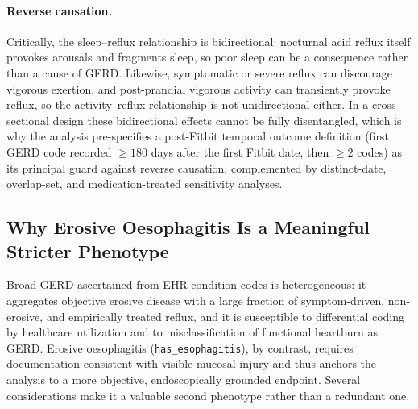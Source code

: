 \documentclass[11pt]{article}
\newcommand{\code}[1]{\texttt{\small #1}}
\begin{document}
\paragraph{Reverse causation.} Critically, the sleep--reflux relationship is bidirectional: nocturnal acid reflux itself provokes arousals and fragments sleep, so poor sleep can be a consequence rather than a cause of GERD. Likewise, symptomatic or severe reflux can discourage vigorous exertion, and post-prandial vigorous activity can transiently provoke reflux, so the activity--reflux relationship is not unidirectional either. In a cross-sectional design these bidirectional effects cannot be fully disentangled, which is why the analysis pre-specifies a post-Fitbit temporal outcome definition (first GERD code recorded $\geq 180$ days after the first Fitbit date, then $\geq 2$ codes) as its principal guard against reverse causation, complemented by distinct-date, overlap-set, and medication-treated sensitivity analyses.

\subsection{Why Erosive Oesophagitis Is a Meaningful Stricter Phenotype}

Broad GERD ascertained from EHR condition codes is heterogeneous: it aggregates objective erosive disease with a large fraction of symptom-driven, non-erosive, and empirically treated reflux, and it is susceptible to differential coding by healthcare utilization and to misclassification of functional heartburn as GERD. Erosive oesophagitis (\code{has_esophagitis}), by contrast, requires documentation consistent with visible mucosal injury and thus anchors the analysis to a more objective, endoscopically grounded endpoint. Several considerations make it a valuable second phenotype rather than a redundant one.
\end{document}
